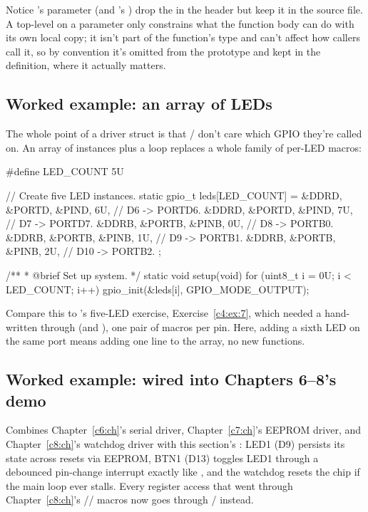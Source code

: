 \noindent Notice 's  parameter (and 's
) drop the  in the header but keep it in the source file. A top-level
 on a parameter only constrains what the function body can do with its own local copy;
it isn't part of the function's type and can't affect how callers call it, so by convention it's
omitted from the prototype and kept in the definition, where it actually matters.

\subsection{Worked example: an array of LEDs}
\label{c9:a:4}
The whole point of a driver struct is that / don't care which
GPIO they're called on. An array of  instances plus a loop replaces a whole family of
per-LED macros:

\begin{ccode}
#define LED_COUNT 5U

// Create five LED instances.
static gpio_t leds[LED_COUNT] =
{
    { &DDRD, &PORTD, &PIND, 6U}, // D6  -> PORTD6.
    { &DDRD, &PORTD, &PIND, 7U}, // D7  -> PORTD7.
    { &DDRB, &PORTB, &PINB, 0U}, // D8  -> PORTB0.
    { &DDRB, &PORTB, &PINB, 1U}, // D9  -> PORTB1.
    { &DDRB, &PORTB, &PINB, 2U}, // D10 -> PORTB2.
};

/**
 * @brief Set up system.
 */
static void setup(void)
{
    for (uint8_t i = 0U; i < LED_COUNT; i++)
    {
        gpio_init(&leds[i], GPIO_MODE_OUTPUT);
    }
}
\end{ccode}

\noindent Compare this to 's five-LED exercise, Exercise~\ref{c4:ex:7}, which
needed a hand-written  through  (and ), one pair of macros
per pin. Here, adding a sixth LED on the same port means adding one line to the 
array, no new functions.

\subsection{Worked example:  wired into Chapters 6--8's demo}
\label{c9:a:5}
Combines Chapter~\ref{c6:ch}'s serial driver, Chapter~\ref{c7:ch}'s EEPROM driver, and
Chapter~\ref{c8:ch}'s watchdog driver with this section's : LED1 (D9) persists its
state across resets via EEPROM, BTN1 (D13) toggles LED1 through a debounced pin-change interrupt
exactly like , and the watchdog resets the chip if the main loop ever stalls. Every
register access that went through Chapter~\ref{c8:ch}'s //%
 macros now goes through / instead.

